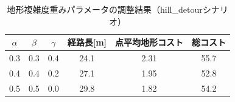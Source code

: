 \begin{table}[htbp]
\centering
\caption{地形複雑度重みパラメータの調整結果（hill\_detourシナリオ）}
\label{tab:terrain_weight_tuning}
\begin{tabular}{ccc|ccc}
\hline
$\alpha$ & $\beta$ & $\gamma$ & 経路長[m] & 点平均地形コスト & 総コスト \\
\hline
0.3 & 0.3 & 0.4 & 24.1 & 2.31 & 55.7 \\
0.4 & 0.4 & 0.2 & 27.1 & 1.95 & 52.8 \\
0.5 & 0.5 & 0.0 & 29.8 & 1.82 & 54.2 \\
\hline
\end{tabular}
\end{table}